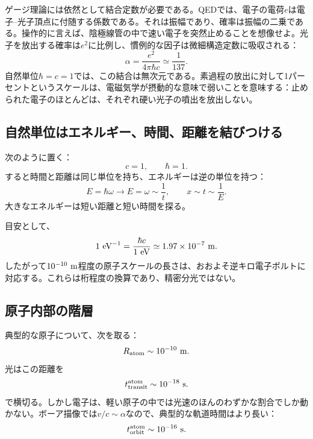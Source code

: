 ゲージ理論には依然として結合定数が必要である。QEDでは、電子の電荷\(e\)は電子--光子頂点に付随する係数である。それは振幅であり、確率は振幅の二乗である。操作的に言えば、陰極線管の中で速い電子を突然止めることを想像せよ。光子を放出する確率は\(e^2\)に比例し、慣例的な因子は微細構造定数に吸収される：
\begin{equation}
\alpha=\frac{e^2}{4\pi\hbar c}
\simeq \frac{1}{137}.
\label{eq:l5-alpha}
\end{equation}
自然単位\(\hbar=c=1\)では、この結合は無次元である。素過程の放出に対して1パーセントというスケールは、電磁気学が摂動的な意味で弱いことを意味する：止められた電子のほとんどは、それぞれ硬い光子の噴出を放出しない。

\subsection{自然単位はエネルギー、時間、距離を結びつける}

次のように置く：
\begin{equation}
c=1,
\qquad
\hbar=1.
\end{equation}
すると時間と距離は同じ単位を持ち、エネルギーは逆の単位を持つ：
\begin{equation}
E=\hbar\omega\longrightarrow E=\omega\sim\frac1t,
\qquad
x\sim t\sim\frac1E.
\end{equation}
大きなエネルギーは短い距離と短い時間を探る。

目安として、
\begin{equation}
1\ {\rm eV}^{-1}
=\frac{\hbar c}{1\ {\rm eV}}
\simeq 1.97\times10^{-7}\ {\rm m}.
\end{equation}
したがって\(10^{-10}\ {\rm m}\)程度の原子スケールの長さは、おおよそ逆キロ電子ボルトに対応する。これらは桁程度の換算であり、精密分光ではない。

\subsection{原子内部の階層}

典型的な原子について、次を取る：
\begin{equation}
R_{\rm atom}\sim10^{-10}\ {\rm m}.
\end{equation}
光はこの距離を
\begin{equation}
t_{\rm transit}^{\rm atom}\sim10^{-18}\ {\rm s}.
\end{equation}
で横切る。しかし電子は、軽い原子の中では光速のほんのわずかな割合でしか動かない。ボーア描像では\(v/c\sim\alpha\)なので、典型的な軌道時間はより長い：
\begin{equation}
t_{\rm orbit}^{\rm atom}\sim10^{-16}\ {\rm s}.
\end{equation}

